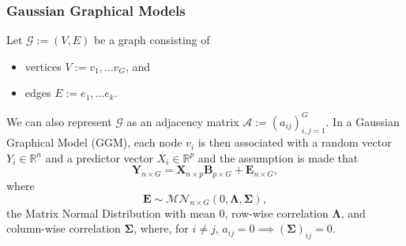 
%

\begin{frame}
  \frametitle{Gaussian Graphical Models}
  Let $\mathcal G := (V, E)$ be a graph consisting of 
  \begin{itemize}
    \item vertices $V := v_1, \ldots v_G$, and 
    \item edges $E := e_1, \ldots e_k$.
  \end{itemize}
  We can also represent $\mathcal G$ as an adjacency matrix $\mathcal A := (a_{ij})_{i,j  = 1}^G$.
  \vfill 
  In a \alert{Gaussian Graphical Model} (GGM), each node $v_i$ is then associated with a random vector $Y_i\in\mathbb R^{n}$ and a predictor vector $X_i \in \mathbb R^{p}$ and the assumption is made that 
  \[
    \mathbf Y_{n\times G} = \mathbf X_{n\times p}\mathbf B_{p\times G} + \mathbf E_{n\times G},   
  \]
  where 
  \[
    \mathbf E\sim \mathcal M\mathcal N_{n\times G}(0, \mathbf \Lambda, \mathbf \Sigma),
  \]
  the Matrix Normal Distribution with mean $0$, row-wise correlation $\mathbf\Lambda$, and column-wise correlation $\mathbf\Sigma$, where, for $i\ne j$, $a_{ij} = 0 \implies (\mathbf\Sigma)_{ij} = 0$.
\end{frame}

%
